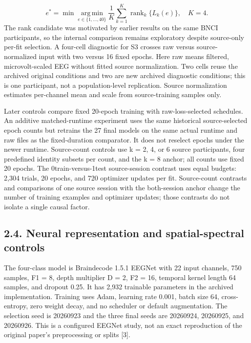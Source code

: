 \documentclass[11pt]{article}
\begin{document}
\begin{equation*}
e^*=\min\operatorname*{arg\,min}_{e\in\{1,\ldots,40\}}\frac{1}{K}\sum_{k=1}^{K}\operatorname{rank}_{k}\{L_k(e)\},\quad K=4.
\end{equation*}
The rank candidate was motivated by earlier results on the same BNCI participants, so the internal comparison remains exploratory despite source-only per-fit selection. A four-cell diagnostic for S3 crosses raw versus source-normalized input with two versus 16 fixed epochs. Here raw means filtered, microvolt-scaled EEG without fitted source normalization. Two cells reuse the archived original conditions and two are new archived diagnostic conditions; this is one participant, not a population-level replication. Source normalization estimates per-channel mean and scale from source-training samples only.

Later controls compare fixed 20-epoch training with raw-loss-selected schedules. An additive matched-runtime experiment uses the same historical source-selected epoch counts but retrains the 27 final models on the same actual runtime and raw files as the fixed-duration comparator. It does not reselect epochs under the newer runtime. Source-count controls use k = 2, 4, or 6 source participants, four predefined identity subsets per count, and the k = 8 anchor; all counts use fixed 20 epochs. The 0train-versus-1test source-session contrast uses equal budgets: 2,304 trials, 20 epochs, and 720 optimizer updates per fit. Source-count contrasts and comparisons of one source session with the both-session anchor change the number of training examples and optimizer updates; those contrasts do not isolate a single causal factor.

\subsection*{2.4. Neural representation and spatial-spectral controls}
The four-class model is Braindecode 1.5.1 EEGNet with 22 input channels, 750 samples, F1 = 8, depth multiplier D = 2, F2 = 16, temporal kernel length 64 samples, and dropout 0.25. It has 2,932 trainable parameters in the archived implementation. Training uses Adam, learning rate 0.001, batch size 64, cross-entropy, zero weight decay, and no scheduler or default augmentation. The selection seed is 20260923 and the three final seeds are 20260924, 20260925, and 20260926. This is a configured EEGNet study, not an exact reproduction of the original paper's preprocessing or splits [3].
\end{document}
